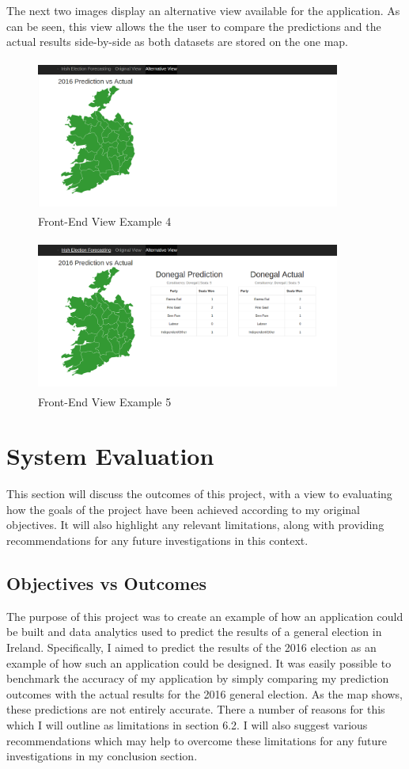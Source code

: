 The next two images display an alternative view available for the application. As can be seen, this view allows the the user to compare the predictions and the actual results side-by-side as both datasets are stored on the one map. 
\begin{figure}[h]
	\caption{Front-End View Example 4}
	\centering
	\includegraphics[width=10cm, height=5cm]{img/view2part1}
\end{figure}
\begin{figure}[h]
	\caption{Front-End View Example 5}
	\centering
	\includegraphics[width=10cm, height=5cm]{img/view2part2}
\end{figure}
\chapter{System Evaluation}
This section will discuss the outcomes of this project, with a view to evaluating how the goals of the project have been achieved according to my original objectives. It will also highlight any relevant limitations, along with providing recommendations for any future investigations in this context.
\section{Objectives vs Outcomes}
The purpose of this project was to create an example of how an application could be built and data analytics used to predict the results of a general election in Ireland. Specifically, I aimed to predict the results of the 2016 election as an example of how such an application could be designed. It was easily possible to benchmark the accuracy of my application by simply comparing my prediction outcomes with the actual results for the 2016 general election. As the map shows, these predictions are not entirely accurate. There a number of reasons for this which I will outline as limitations in section 6.2. I will also suggest various recommendations which may help to overcome these limitations for any future investigations in my conclusion section.  

